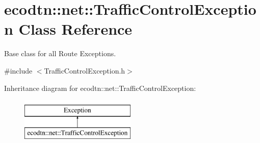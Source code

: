 \hypertarget{classecodtn_1_1net_1_1TrafficControlException}{}\section{ecodtn\+:\+:net\+:\+:Traffic\+Control\+Exception Class Reference}
\label{classecodtn_1_1net_1_1TrafficControlException}


Base class for all Route Exceptions.  




{\ttfamily \#include $<$Traffic\+Control\+Exception.\+h$>$}

Inheritance diagram for ecodtn\+:\+:net\+:\+:Traffic\+Control\+Exception\+:\begin{figure}[H]
\begin{center}
\leavevmode
\includegraphics[height=2.000000cm]{classecodtn_1_1net_1_1TrafficControlException}
\end{center}
\end{figure}
